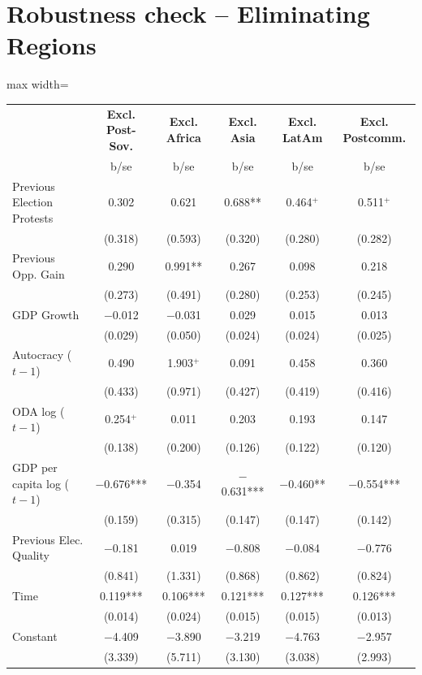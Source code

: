 \documentclass[USletter,12pt, titlepage]{article} %
\begin{document}
\newpage
\section{Robustness check -- Eliminating Regions}
\begin{table}[H]
\centering
\begin{adjustbox}{max width=\textwidth}
\begin{threeparttable}
\begin{tabular}{lccccc}
\toprule
 & \textbf{Excl. Post-Sov.} & \textbf{Excl. Africa} & \textbf{Excl. Asia} & \textbf{Excl. LatAm} & \textbf{Excl. Postcomm.} \\
 & b/se & b/se & b/se & b/se & b/se \\
\midrule
Previous Election Protests & 0.302 & 0.621 & 0.688** & 0.464$^{+}$ & 0.511$^{+}$ \\
 & (0.318) & (0.593) & (0.320) & (0.280) & (0.282) \\
Previous Opp. Gain & 0.290 & 0.991** & 0.267 & 0.098 & 0.218 \\
 & (0.273) & (0.491) & (0.280) & (0.253) & (0.245) \\
GDP Growth & $-$0.012 & $-$0.031 & 0.029 & 0.015 & 0.013 \\
 & (0.029) & (0.050) & (0.024) & (0.024) & (0.025) \\
Autocracy ($t-1$) & 0.490 & 1.903$^{+}$ & 0.091 & 0.458 & 0.360 \\
 & (0.433) & (0.971) & (0.427) & (0.419) & (0.416) \\
ODA log ($t-1$) & 0.254$^{+}$ & 0.011 & 0.203 & 0.193 & 0.147 \\
 & (0.138) & (0.200) & (0.126) & (0.122) & (0.120) \\
GDP per capita log ($t-1$) & $-$0.676*** & $-$0.354 & $-$0.631*** & $-$0.460** & $-$0.554*** \\
 & (0.159) & (0.315) & (0.147) & (0.147) & (0.142) \\
Previous Elec. Quality & $-$0.181 & 0.019 & $-$0.808 & $-$0.084 & $-$0.776 \\
 & (0.841) & (1.331) & (0.868) & (0.862) & (0.824) \\
Time & 0.119*** & 0.106*** & 0.121*** & 0.127*** & 0.126*** \\
 & (0.014) & (0.024) & (0.015) & (0.015) & (0.013) \\
Constant & $-$4.409 & $-$3.890 & $-$3.219 & $-$4.763 & $-$2.957 \\
 & (3.339) & (5.711) & (3.130) & (3.038) & (2.993) \\

\end{tabular}
\end{threeparttable}
\end{adjustbox}
\end{table}
\end{document}
